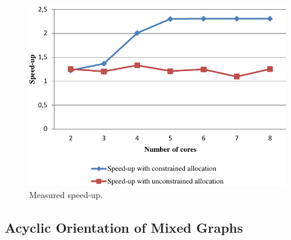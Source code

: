 \begin{figure}[htbp]
\centering
\includegraphics{figures/realspeedup.pdf}
\caption{Measured speed-up.}
\label{fig:real-speedup}
\end{figure} 

\subsection{Acyclic Orientation of Mixed Graphs}

